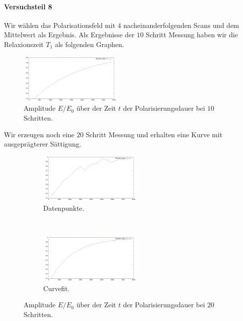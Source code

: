 \documentclass{subfiles}
\begin{document}
\paragraph*{Versuchsteil 8}
    Wir wählen das Polarisationsfeld mit $4$ nacheinanderfolgenden Scans und dem Mittelwert als Ergebnis. 
    Als Ergebnisse der $10$ Schritt Messung haben wir die Relaxionszeit $T_1$ als folgenden Graphen.
    \begin{figure}[H]
        \centering
        \includegraphics[width=5cm]{Live-Dokumente/Bilder/B1-10steps/T1.png}
        \caption{Amplitude $E/E_0$ über der Zeit $t$ der Polarisierungsdauer bei $10$ Schritten.}
        \label{fig:T1}
    \end{figure}
    Wir erzeugen noch eine $20$ Schritt Messung und erhalten eine Kurve mit ausgeprägterer Sättigung.
    \begin{figure}
        \centering
        \begin{subfigure}[b]{0.4\textwidth}
            \centering
            \includegraphics[width=5cm]{Live-Dokumente/Bilder/T1-20steps/T1.png}
            \caption{Datenpunkte.}
        \end{subfigure}
        \
        \begin{subfigure}[b]{0.4\textwidth}
            \centering
            \includegraphics[width=5cm]{Live-Dokumente/Bilder/T1-20steps/T1_fit.png}
            \caption{Curvefit.}
        \end{subfigure}
        \caption{Amplitude $E/E_0$ über der Zeit $t$ der Polarisierungsdauer bei $20$ Schritten.}
        \label{fig:T1-20steps}
    \end{figure}
\end{document}
